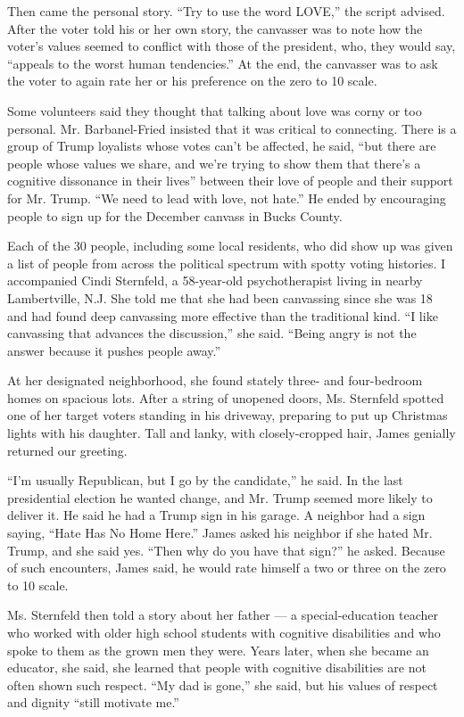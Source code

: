 Then came the personal story. ``Try to use the word LOVE,'' the script
advised. After the voter told his or her own story, the canvasser was to
note how the voter's values seemed to conflict with those of the
president, who, they would say, ``appeals to the worst human
tendencies.'' At the end, the canvasser was to ask the voter to again
rate her or his preference on the zero to 10 scale.

Some volunteers said they thought that talking about love was corny or
too personal. Mr. Barbanel-Fried insisted that it was critical to
connecting. There is a group of Trump loyalists whose votes can't be
affected, he said, ``but there are people whose values we share, and
we're trying to show them that there's a cognitive dissonance in their
lives'' between their love of people and their support for Mr. Trump.
``We need to lead with love, not hate.'' He ended by encouraging people
to sign up for the December canvass in Bucks County.

Each of the 30 people, including some local residents, who did show up
was given a list of people from across the political spectrum with
spotty voting histories. I accompanied Cindi Sternfeld, a 58-year-old
psychotherapist living in nearby Lambertville, N.J. She told me that she
had been canvassing since she was 18 and had found deep canvassing more
effective than the traditional kind. ``I like canvassing that advances
the discussion,'' she said. ``Being angry is not the answer because it
pushes people away.''

At her designated neighborhood, she found stately three- and
four-bedroom homes on spacious lots. After a string of unopened doors,
Ms. Sternfeld spotted one of her target voters standing in his driveway,
preparing to put up Christmas lights with his daughter. Tall and lanky,
with closely-cropped hair, James genially returned our greeting.

``I'm usually Republican, but I go by the candidate,'' he said. In the
last presidential election he wanted change, and Mr. Trump seemed more
likely to deliver it. He said he had a Trump sign in his garage. A
neighbor had a sign saying, ``Hate Has No Home Here.'' James asked his
neighbor if she hated Mr. Trump, and she said yes. ``Then why do you
have that sign?'' he asked. Because of such encounters, James said, he
would rate himself a two or three on the zero to 10 scale.

Ms. Sternfeld then told a story about her father --- a special-education
teacher who worked with older high school students with cognitive
disabilities and who spoke to them as the grown men they were. Years
later, when she became an educator, she said, she learned that people
with cognitive disabilities are not often shown such respect. ``My dad
is gone,'' she said, but his values of respect and dignity ``still
motivate me.''

